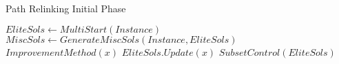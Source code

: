 \begin{algorithm}
  \hline \vspace{3pt}
  \caption{Path Relinking Initial Phase}\label{pr_init}
  \vspace{3pt} \hline
  \begin{algorithmic}[0]
    \State $EliteSols \gets MultiStart(Instance)$
    \Repeat
    \State $MiscSols \gets GenerateMiscSols(Instance,EliteSols)$
    \State $ImprovementMethod(x)$
    \State $EliteSols.Update(x)$
    \EndFor
    \State $SubsetControl(EliteSols)$
    \EndProcedure
    \hline
  \end{algorithmic}
\end{algorithm}
